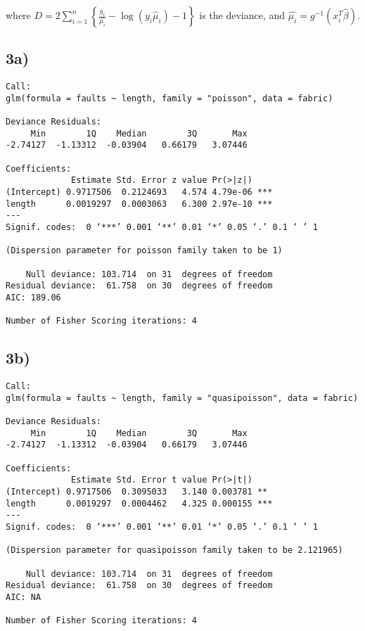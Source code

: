 \documentclass[12pt,]{article}
\newcommand{\bc}[1]{ \left\{#1\right\} }
\newcommand{\suml}{ \sum_{i=1}^n }
\newcommand{\ds}{ \displaystyle }
\begin{document}
where
\(D = 2\ds\suml\bc{\frac{y_i}{\hat{\mu_i}} - \log(y_i\hat\mu_i) -1}\) is
the deviance, and \(\hat{\mu_i} = g^{-1}(x_i^T\hat\beta)\).

\subsection{3a)}\label{a-2}

\begin{verbatim}
Call:
glm(formula = faults ~ length, family = "poisson", data = fabric)

Deviance Residuals:
     Min        1Q    Median        3Q       Max
-2.74127  -1.13312  -0.03904   0.66179   3.07446

Coefficients:
             Estimate Std. Error z value Pr(>|z|)
(Intercept) 0.9717506  0.2124693   4.574 4.79e-06 ***
length      0.0019297  0.0003063   6.300 2.97e-10 ***
---
Signif. codes:  0 ‘***’ 0.001 ‘**’ 0.01 ‘*’ 0.05 ‘.’ 0.1 ‘ ’ 1

(Dispersion parameter for poisson family taken to be 1)

    Null deviance: 103.714  on 31  degrees of freedom
Residual deviance:  61.758  on 30  degrees of freedom
AIC: 189.06

Number of Fisher Scoring iterations: 4
\end{verbatim}

\subsection{3b)}\label{b-2}

\begin{verbatim}
Call:
glm(formula = faults ~ length, family = "quasipoisson", data = fabric)

Deviance Residuals:
     Min        1Q    Median        3Q       Max
-2.74127  -1.13312  -0.03904   0.66179   3.07446

Coefficients:
             Estimate Std. Error t value Pr(>|t|)
(Intercept) 0.9717506  0.3095033   3.140 0.003781 **
length      0.0019297  0.0004462   4.325 0.000155 ***
---
Signif. codes:  0 ‘***’ 0.001 ‘**’ 0.01 ‘*’ 0.05 ‘.’ 0.1 ‘ ’ 1

(Dispersion parameter for quasipoisson family taken to be 2.121965)

    Null deviance: 103.714  on 31  degrees of freedom
Residual deviance:  61.758  on 30  degrees of freedom
AIC: NA

Number of Fisher Scoring iterations: 4
\end{verbatim}
\end{document}
